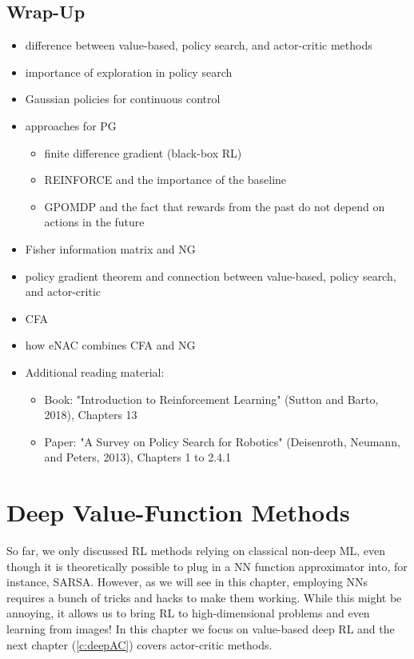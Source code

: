 	\section{Wrap-Up}
		\begin{itemize}
			\item difference between value-based, policy search, and actor-critic methods
			\item importance of exploration in policy search
			\item Gaussian policies for continuous control
			\item approaches for \acl{PG}
				\begin{itemize}
					\item finite difference gradient (black-box \ac{RL})
					\item REINFORCE and the importance of the baseline
					\item \ac{GPOMDP} and the fact that rewards from the past do not depend on actions in the future
				\end{itemize}
			\item Fisher information matrix and \acl{NG}
			\item policy gradient theorem and connection between value-based, policy search, and actor-critic
			\item \acl{CFA}
			\item how \ac{eNAC} combines \ac{CFA} and \ac{NG}
			\item Additional reading material:
				\begin{itemize}
					\item Book: "Introduction to Reinforcement Learning" (Sutton and Barto, 2018), Chapters 13  %
					\item Paper: "A Survey on Policy Search for Robotics" (Deisenroth, Neumann, and Peters, 2013), Chapters 1 to 2.4.1  %
				\end{itemize}
		\end{itemize}

\chapter{Deep Value-Function Methods}
	So far, we only discussed \ac{RL} methods relying on classical non-deep \ac{ML}, even though it is theoretically possible to plug in a \ac{NN} function approximator into, for instance, \ac{SARSA}. However, as we will see in this chapter, employing \acp{NN} requires a bunch of tricks and hacks to make them working. While this might be annoying, it allows us to bring \ac{RL} to high-dimensional problems and even learning from images! In this chapter we focus on value-based deep \ac{RL} and the next chapter (\autoref{c:deepAC}) covers actor-critic methods.

